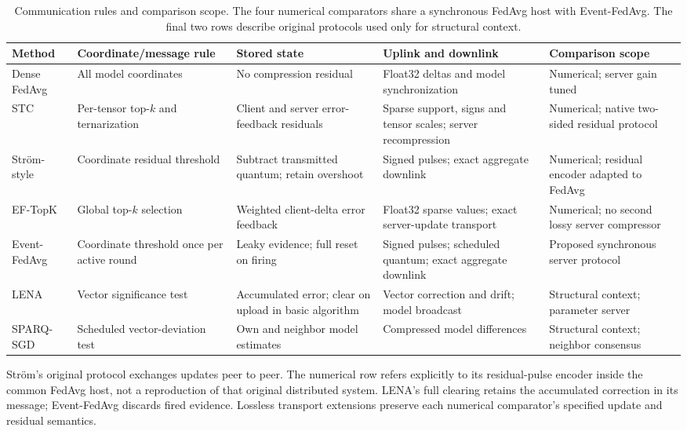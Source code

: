 \documentclass[conference]{IEEEtran}
\newcommand{\coreColor}{\color{coreblue}}
\newcommand{\coreRev}[1]{{\coreColor #1}}
\begin{document}
\begin{table}[!t]
\caption{\coreRev{Communication rules and comparison scope. The four numerical
comparators share a synchronous FedAvg host with Event-FedAvg. The final two
rows describe original protocols used only for structural context.}}
\label{tab:structural-comparison}
\centering\footnotesize\coreColor
\setlength{\tabcolsep}{3pt}\renewcommand{\arraystretch}{1.1}
\begin{tabular}{@{}>{\raggedright\arraybackslash}p{}
 >{\raggedright\arraybackslash}p{}
 >{\raggedright\arraybackslash}p{}
 >{\raggedright\arraybackslash}p{}
 >{\raggedright\arraybackslash}p{}@{}}
\toprule
Method & Coordinate/message rule & Stored state & Uplink and downlink & Comparison scope \\
\midrule
Dense FedAvg~\cite{mcmahan2017fedavg}
 & All model coordinates & No compression residual
 & Float32 deltas and model synchronization & Numerical; server gain tuned \\
STC~\cite{sattler2020stc}
 & Per-tensor top-$k$ and ternarization & Client and server error-feedback residuals
 & Sparse support, signs and tensor scales; server recompression
 & Numerical; native two-sided residual protocol \\
Str\"om-style~\cite{strom2015distributed}
 & Coordinate residual threshold & Subtract transmitted quantum; retain overshoot
 & Signed pulses; exact aggregate downlink
 & Numerical; residual encoder adapted to FedAvg \\
EF-TopK~\cite{stich2018memory}
 & Global top-$k$ selection & Weighted client-delta error feedback
 & Float32 sparse values; exact server-update transport
 & Numerical; no second lossy server compressor \\
Event-FedAvg
 & Coordinate threshold once per active round & Leaky evidence; full reset on firing
 & Signed pulses; scheduled quantum; exact aggregate downlink
 & Proposed synchronous server protocol \\
\midrule
LENA~\cite{ghadikolaei2021lena}
 & Vector significance test & Accumulated error; clear on upload in basic algorithm
 & Vector correction and drift; model broadcast
 & Structural context; parameter server \\
SPARQ-SGD~\cite{singh2023sparq}
 & Scheduled vector-deviation test & Own and neighbor model estimates
 & Compressed model differences & Structural context; neighbor consensus \\
\bottomrule
\end{tabular}
\par\smallskip\parbox{.99\textwidth}{\footnotesize
Str\"om's original protocol exchanges updates peer to peer. The numerical row
refers explicitly to its residual-pulse encoder inside the common FedAvg host,
not a reproduction of that original distributed system. LENA's full clearing
retains the accumulated correction in its message; Event-FedAvg discards fired
evidence. Lossless transport extensions preserve each numerical comparator's
specified update and residual semantics.}
\end{table}
\end{document}
